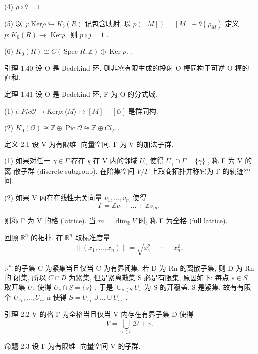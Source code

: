 \documentclass[]{article}
\begin{document}
{(4) $\rho \circ \theta = 1$ 

(5) 以 $j : \mathrm { K e r } \rho \hookrightarrow K _ { 0 } ( R )$ 记包含映射, 以 $p ( [ M ] ) = [ M ] - \theta ( \rho _ { M } )$ 定义 $p : K _ { 0 } ( R ) \to$ $\mathrm { K e r } \rho ,$ 则 $p \circ j = 1$ . 

(6) $K _ { 0 } ( R ) \cong C ( \operatorname { S p e c } R , \mathbb { Z } ) \oplus \operatorname { K e r } \rho .$ . 

引理 1.40 设 O 是 Dedekind 环. 则非零有限生成的投射 O 模同构于可逆 O 模的 直和. 

定理 1.41 设 O 是 Dedekind 环, F 为 O 的分式域. 

(1) $\iota : P i c \mathcal { O } \to \mathrm { K e r } \rho : \langle M \rangle \mapsto [ M ] - [ \mathcal { O } ]$ 是群同构. 

(2) $K _ { 0 } ( \mathcal { O } ) \cong \mathbb { Z } \oplus \operatorname { P i c } \mathcal { O } \cong \mathbb { Z } \oplus C l _ { F }$ . 

定义 2.1 设 V 为有限维 -向量空间, Γ 为 V 的加法子群. 

(1) 如果对任一 $\gamma \in \Gamma$ 存在 γ 在 V 内的邻域 $U _ { \gamma }$ 使得 $U _ { \gamma } \cap \Gamma = \{ \gamma \}$ , 称 Γ 为 V 的离 散子群 (discrete subgroup). 在陪集空间 $V / \Gamma$ 上取商拓扑并称它为 Γ 的轨迹空间. 

(2) 如果 V 内存在线性无关向量 $v _ { 1 } , \ldots , v _ { m }$ 使得 $$
\Gamma = \mathbb {Z} v _ {1} + \dots + \mathbb {Z} v _ {m},
$$

则称 Γ 为 V 的格 (lattice). 当 $m = \dim _ { \mathbb { R } } V$ 时, 称 Γ 为全格 (full lattice). 

回顾 $\mathbb { R } ^ { n }$ 的拓扑. 在 $\mathbb { R } ^ { n }$ 取标准度量 $$
\left\| \left(x _ {1}, \dots , x _ {n}\right) \right\| = \sqrt {x _ {1} ^ {2} + \cdots + x _ {n} ^ {2}},
$$

$\mathbb { R } ^ { n }$ 的子集 C 为紧集当且仅当 C 为有界闭集. 若 D 为 Rn 的离散子集, 则 D 为 Rn 的 闭集, 所以 $C \cap D$ 为紧集, 但是紧离散集 S 必是有限集, 原因如下: 每点 $s \in S$ 取开集 $U _ { s }$ 使得 $U _ { s } \cap S = \{ s \}$ , 于是 $\cup _ { s \in S } U _ { s }$ 为 S 的开覆盖, S 是紧集, 故有有限个 $U _ { s _ { 1 } } , \ldots , U _ { s _ { \tau } }$ n 使得 $S = U _ { s _ { 1 } } \cup \dots \cup U _ { s _ { n } }$ . 

引理 2.2 V 的格 Γ 为全格当且仅当 V 内存在有界子集 D 使得 $$
V = \bigcup_ {\gamma \in \Gamma} \mathcal {D} + \gamma .
$$

命题 2.3 设 Γ 为有限维 -向量空间 V 的子群. 

}
\end{document}

